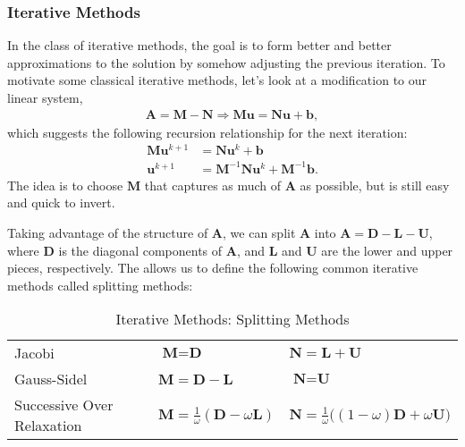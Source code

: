 \subsubsection{Iterative Methods}

In the class of iterative methods, the goal is to form better and better approximations to the solution by somehow adjusting the previous iteration. To motivate some classical iterative methods, let's look at a modification to our linear system,
\begin{align}
\textbf{A} = \textbf{M} - \textbf{N} \Rightarrow \textbf{M} \textbf{u} = \textbf{N} \textbf{u} + \textbf{b},
\end{align}
which suggests the following recursion relationship for the next iteration:
\begin{align}
\textbf{M} \textbf{u}^{k+1} &= \textbf{N} \textbf{u}^k + \textbf{b} \\
\textbf{u}^{k+1} &= \textbf{M}^{-1} \textbf{N} \textbf{u}^k + \textbf{M}^{-1} \textbf{b}.
\end{align}
The idea is to choose $\textbf{M}$ that captures as much of $\textbf{A}$ as possible, but is still easy and quick to invert.

Taking advantage of the structure of $\textbf{A}$, we can split $\textbf{A}$ into $\textbf{A} = \textbf{D} - \textbf{L} - \textbf{U}$, where $\textbf{D}$ is the diagonal components of $\textbf{A}$, and $\textbf{L}$ and $\textbf{U}$ are the lower and upper pieces, respectively. The allows us to define the following common iterative methods called splitting methods:

\begin{table}[h!]
    \centering
    \begin{tabular}{ | l | l | l |}
        \hline
        Jacobi & $\textbf{M} = \textbf{D}$ & $\textbf{N} = \textbf{L} + \textbf{U}$ \\
        Gauss-Sidel & $\textbf{M} = \textbf{D} - \textbf{L}$ & $\textbf{N} = \textbf{U}$ \\
        Successive Over Relaxation & $\textbf{M} = \frac{1}{\omega}(\textbf{D} - \omega \textbf{L})$ & $\textbf{N} = \frac{1}{\omega} \big( (1 - \omega) \textbf{D} + \omega \textbf{U} \big)$ \\
        \hline
    \end{tabular}
    \caption{Iterative Methods: Splitting Methods}
\end{table}


